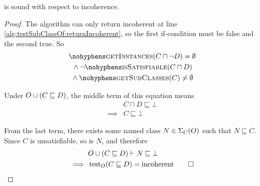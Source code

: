\documentclass[paper.tex]{subfiles}
\begin{document}
\begin{lemma}
  \label{lem:testSubClassOfIncoherentSound}
   is sound with respect to incoherence.
\end{lemma}
\begin{proof}
  The algorithm can only return incoherent at line \ref{alg:testSubClassOf:returnIncoherent}, so the first if-condition must be false and the second true.  So
  \begin{multline*}
    \textproc{getInstances}(C \sqcap \neg D) = \emptyset \\
    {} \land \neg \textproc{isSatisfiable}(C \sqcap D) \\
    {} \land \textproc{getSubClasses}(C) \ne \emptyset
  \end{multline*}

  Under $O \cup (C \sqsubseteq D)$, the middle term of this equation means
  \begin{align*}
    & C \sqcap D \sqsubseteq \bot \\
    \implies{}& C \sqsubseteq \bot
  \end{align*}

  From the last term, there exists some named class $N \in \Sigma_C(O)$ such that $N \sqsubseteq C$.  Since $C$ is unsatisfiable, so is $N$, and therefore
  \begin{align*}
    & O \cup (C \sqsubseteq D) \vdash N \sqsubseteq \bot \\
    \implies{}& \operatorname{test}_O(C \sqsubseteq D) = \mathrm{incoherent}
    \qed
  \end{align*}
\end{proof}
\end{document}
